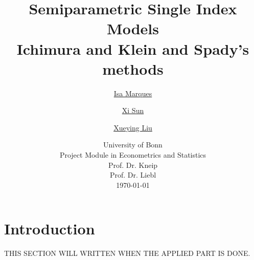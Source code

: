 \documentclass[a4paper]{article}
\begin{document}
	\title{
	\vspace{1cm}
	\Huge \textbf{ Semiparametric Single Index Models }\\ \Large Ichimura and Klein and Spady's methods \\
	}
	
	\vspace{1cm}
	
	
	\author{\Large \href{mailto:first.student@smail.fh-koeln.de}{Isa Marques}\and \Large \href{mailto:second.student@smail.fh-koeln.de}{Xi Sun} \and \Large \href{mailto:second.student@smail.fh-koeln.de}{Xueying Liu}
	\vspace{1cm}}
	
	\date{
	\large University of Bonn \\ Project Module in Econometrics and Statistics\\ 
	\vspace{0.8cm}
	\large Prof. Dr. Kneip \\
	\large Prof. Dr. Liebl \\
	\vspace{1cm}
	\today
	}

	\maketitle
	\setlength{\parindent}{0pt}

\vspace{2cm}
\begin{abstract}


\end{abstract}
	\newpage
	\tableofcontents
	\newpage
	
\section{Introduction} %
\label{sec:introduction}
THIS SECTION WILL WRITTEN WHEN THE APPLIED PART IS DONE.



\end{document}
